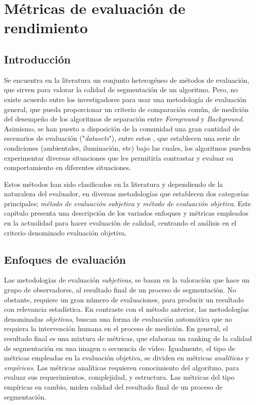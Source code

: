 \chapter{Métricas de evaluación de rendimiento}\label{chap:metricas}
 
\section{Introducción}

Se encuentra en la literatura un conjunto heterogéneo de métodos de evaluación, que sirven para valorar la calidad de segmentación de un algoritmo. Pero, no existe acuerdo entre los investigadores para usar una metodología de evaluación general, que pueda proporcionar un criterio de comparación común, de medición del desempeño de los algoritmos de separación entre \emph{Foreground} y \emph{Background}. Asimismo, se han puesto a disposición de la comunidad una gran cantidad de escenarios de evaluación ("\emph{datasets}"), entre estos \cite{singh_muhavi_2010}, que establecen una serie de condiciones (ambientales, iluminación, etc) bajo las cuales, los algoritmos pueden experimentar diversas situaciones que les permitiría contrastar y evaluar su comportamiento en diferentes situaciones.

Estos métodos han sido clasificados en la literatura y dependiendo de la naturaleza del evaluador, en diversas metodologías que establecen dos categorías principales; \emph{método de evaluación subjetiva} \cite{mckoen_evaluation_2000} y \emph{método de evaluación objetiva}. Este capítulo presenta una descripción de los variados enfoques y métricas empleados en la actualidad para hacer evaluación de calidad, centrando el análisis en el criterio denominado evaluación objetiva.

\section{Enfoques de evaluación}

Las metodologías de evaluación \emph{subjetivas}, se basan en la valoración que hace un grupo de observadores, al resultado final de un proceso de segmentación. No obstante, requiere un gran número de evaluaciones, para producir un resultado con relevancia estadística. En contraste con el método anterior, las metodologías denominadas \emph{objetivas}, buscan una forma de evaluación automática que no requiera la intervención humana en el proceso de medición. En general, el resultado final es una mixtura de métricas, que elaboran un ranking de la calidad de segmentación en una imagen o secuencia de vídeo. Igualmente, el tipo de métricas empleadas en la evaluación objetiva, se dividen en métricas \emph{analíticas} y \emph{empíricas}. Las métricas analíticas requieren conocimiento del algoritmo, para evaluar sus requerimientos,  complejidad,  y estructura. Las métricas del tipo empíricas en cambio, miden calidad del resultado final de un proceso de segmentación.

